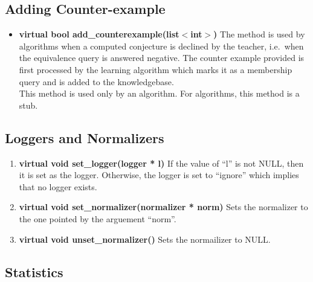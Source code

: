 \subsection*{Adding Counter-example}

\begin{itemize}
 \item \textbf{virtual bool add\_counterexample(list$<$int$>$)} \vskip 1pt
	The method is used by \online algorithms when a computed conjecture is declined by the teacher, i.e.\ when the equivalence query is answered negative. The counter example provided is first processed by the learning algorithm which marks it as a membership query and is added to the knowledgebase. \\
	This method is used only by an \online algorithm. For \offline algorithms, this method is a stub.
\end{itemize}

\subsection*{Loggers and Normalizers}

\begin{enumerate}
 \item \textbf{virtual void set\_logger(logger * l)} \vskip 1pt
	If the value of ``l'' is not NULL, then it is set as the logger. Otherwise, the logger is set to ``ignore'' which implies that no logger exists.

 \item \textbf{virtual void set\_normalizer(normalizer * norm)} \vskip 1pt
	Sets the normalizer to the one pointed by the arguement ``norm''.

 \item \textbf{virtual void unset\_normalizer()} \vskip 1pt
	Sets the normailizer to NULL. 
\end{enumerate}

\subsection*{Statistics}

